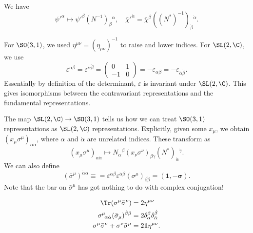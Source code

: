 \documentclass[a4paper]{article}
\begin{document}
\begin{defi}
  We have
  \[
    \psi'^\alpha \mapsto \psi'^\beta (N^{-1})_\beta\!^\alpha,\quad \bar{\chi}'^{\dot{\alpha}} = \bar{\chi}^{\dot{\beta}} ((N^*)^{-1})_{\dot{\beta}}\!^{\dot{\alpha}}.
  \]
\end{defi}

For $\SO(3, 1)$, we used $\eta^{\mu\nu} = (\eta_{\mu\nu})^{-1}$ to raise and lower indices. For $\SL(2, \C)$, we use
\[
  \varepsilon^{\alpha\beta} = \varepsilon^{\dot{\alpha}\dot{\beta}} =
  \begin{pmatrix}
    0 & 1\\
    -1 & 0
  \end{pmatrix} = - \varepsilon_{\alpha\beta} = - \varepsilon_{\dot{\alpha}\dot{\beta}}.
\]
Essentially by definition of the determinant, $\varepsilon$ is invariant under $\SL(2, \C)$. This gives isomorphisms between the contravariant representations and the fundamental representations.

The map $\SL(2, \C) \to \SO(3, 1)$ tells us how we can treat $\SO(3, 1)$ representations as $\SL(2, \C)$ representations. Explicitly, given some $x_\mu$, we obtain $(x_\mu \sigma^\mu)_{\alpha \dot{\alpha}}$, where $\alpha$ and $\dot{\alpha}$ are unrelated indices. These transform as
\[
  (x_\mu \sigma^\mu)_{\alpha \dot{\alpha}} \mapsto N_\alpha\!^\beta (x_\nu \sigma^\nu)_{\beta \dot{\gamma}} (N^*)_{\dot{\alpha}}\!^{\dot{\gamma}}.
\]
We can also define
\[
  (\bar{\sigma}^\mu)^{\dot{\alpha} \alpha} \equiv = \varepsilon^{\alpha \beta} \varepsilon^{\dot{\alpha} \dot{\beta}} (\sigma^\mu)_{\beta \dot{\beta}} = (\mathbf{1}, -\boldsymbol\sigma).
\]
Note that the bar on $\bar{\sigma}^\mu$ has got nothing to do with complex conjugation!
\begin{ex}\leavevmode
  \begin{align*}
    \Tr(\sigma^\mu \bar{\sigma}^\nu) &= 2\eta^{\mu\nu}\\
    \sigma^\mu\!_{\alpha \dot{\alpha}} (\bar{\sigma}_\mu)^{\dot{\beta} \beta} &= 2 \delta_{\alpha}^\beta \delta_{\dot{\alpha}}^{\dot{\beta}}\\
    \sigma^\mu \bar{\sigma}^\nu + \sigma^\nu \bar{\sigma}^\mu &= 2\mathbf{1} \eta^{\mu\nu}.
  \end{align*}
\end{ex}
\end{document}
